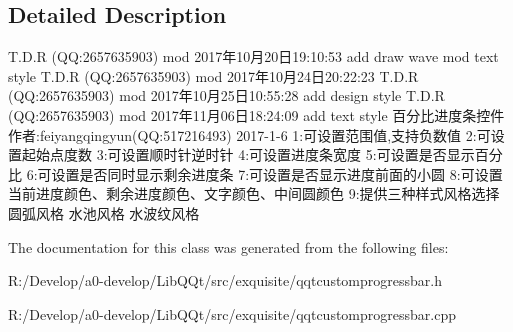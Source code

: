 \subsection{Detailed Description}
T.\+D.\+R (QQ\+:2657635903) mod 2017年10月20日19\+:10\+:53 add draw wave mod text style T.\+D.\+R (QQ\+:2657635903) mod 2017年10月24日20\+:22\+:23 T.\+D.\+R (QQ\+:2657635903) mod 2017年10月25日10\+:55\+:28 add design style T.\+D.\+R (QQ\+:2657635903) mod 2017年11月06日18\+:24\+:09 add text style 百分比进度条控件 作者\+:feiyangqingyun(\+Q\+Q\+:517216493) 2017-\/1-\/6 1\+:可设置范围值,支持负数值 2\+:可设置起始点度数 3\+:可设置顺时针逆时针 4\+:可设置进度条宽度 5\+:可设置是否显示百分比 6\+:可设置是否同时显示剩余进度条 7\+:可设置是否显示进度前面的小圆 8\+:可设置当前进度颜色、剩余进度颜色、文字颜色、中间圆颜色 9\+:提供三种样式风格选择 圆弧风格 水池风格 水波纹风格 

The documentation for this class was generated from the following files\+:\begin{DoxyCompactItemize}
\item 
R\+:/\+Develop/a0-\/develop/\+Lib\+Q\+Qt/src/exquisite/qqtcustomprogressbar.\+h\item 
R\+:/\+Develop/a0-\/develop/\+Lib\+Q\+Qt/src/exquisite/qqtcustomprogressbar.\+cpp\end{DoxyCompactItemize}
